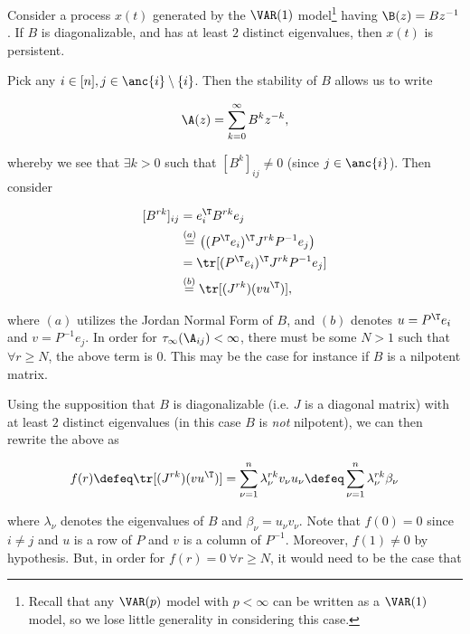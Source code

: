 \begin{example}
  Consider a process $x(t)$ generated by the $\VAR(1)$
  model\footnote{Recall that any $\VAR(p)$ model with $p < \infty$ can
    be written as a $\VAR(1)$ model, so we lose little generality in
    considering this case.}  having $\B(z) = Bz^{-1}$.  If $B$ is
  diagonalizable, and has at least $2$ distinct eigenvalues, then
  $x(t)$ is persistent.

  Pick any $i \in [n], j \in \anc{i} \setminus \{i\}$.  Then the
  stability of $B$ allows us to write

  \begin{equation*}
    \A(z) = \sum_{k = 0}^\infty B^k z^{-k},
  \end{equation*}

  whereby we see that $\exists k > 0$ such that $[B^k]_{ij} \ne 0$
  (since $j \in \anc{i}$).  Then consider

  \begin{equation*}
    \begin{aligned}
      [B^{rk}]_{ij} &= e_i^\T B^{rk} e_j \\
      &\overset{(a)}{=} \big((P^\T e_i)^\T J^{rk} P^{-1}e_j\big)\\
      &= \tr [(P^\T e_i)^\T J^{rk} P^{-1}e_j]\\
      &\overset{(b)}{=} \tr [(J^{rk}) (v u^\T)],
    \end{aligned}
  \end{equation*}

  where $(a)$ utilizes the Jordan Normal Form of $B$, and $(b)$
  denotes $u = P^\T e_i$ and $v = P^{-1}e_j$.  In order for
  $\tau_\infty(\A_{ij}) < \infty$, there must be some $N > 1$ such
  that $\forall r \ge N$, the above term is $0$.  This may be the case
  for instance if $B$ is a nilpotent matrix.  

  Using the supposition that $B$ is diagonalizable (i.e. $J$ is a
  diagonal matrix) with at least $2$ distinct eigenvalues (in this
  case $B$ is \textit{not} nilpotent), we can then rewrite the above
  as

  \begin{equation*}
    f(r) \defeq \tr [(J^{rk}) (v u^\T)] = \sum_{\nu = 1}^n \lambda_\nu ^{rk} v_\nu u_\nu \defeq \sum_{\nu = 1}^n \lambda_\nu^{rk} \beta_\nu
  \end{equation*}

  where $\lambda_\nu$ denotes the eigenvalues of $B$ and
  $\beta_\nu = u_\nu v_\nu$.  Note that $f(0) = 0$ since $i \ne j$ and
  $u$ is a row of $P$ and $v$ is a column of $P^{-1}$.  Moreover,
  $f(1) \ne 0$ by hypothesis.  But, in order for
  $f(r) = 0\ \forall r \ge N$, it would need to be the case that


\end{example}
